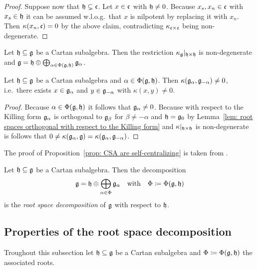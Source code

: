 \begin{proof}
 Suppose now that $\mathfrak{h} \subsetneq \mathfrak{c}$. Let $x \in \mathfrak{c}$ with $\mathfrak{h} \neq 0$. Because $x_s, x_n \in \mathfrak{c}$ with $x_s \in \mathfrak{h}$ it can be assumed w.l.o.g.\ that $x$ is nilpotent by replacing it with $x_n$. Then $\kappa(x_n, \mathfrak{c}) = 0$ by the above claim, contradicting $\kappa_{\mathfrak{c} \times \mathfrak{c}}$ being non-degenerate.
\end{proof}


\begin{corollary}
 Let $\mathfrak{h} \subseteq \mathfrak{g}$ be a Cartan subalgebra. Then the restriction $\kappa_{\mathfrak{g}}|_{\mathfrak{h} \times \mathfrak{h}}$ is non-degenerate and $\mathfrak{g} = \mathfrak{h} \oplus \bigoplus_{\alpha \in \Phi(\mathfrak{g},\mathfrak{h})} \mathfrak{g}_\alpha$.
\end{corollary}


\begin{corollary}\label{cor: g alpha and g -alpha pair non degenerate with the Killing form}
 Let $\mathfrak{h} \subseteq \mathfrak{g}$ be a Cartan subalgebra and $\alpha \in \Phi(\mathfrak{g},\mathfrak{h})$. Then $\kappa(\mathfrak{g}_\alpha, \mathfrak{g}_{-\alpha}) \neq 0$, i.e.\ there exists $x \in \mathfrak{g}_\alpha$ and $y \in \mathfrak{g}_{-\alpha}$ with $\kappa(x,y) \neq 0$.
\end{corollary}
\begin{proof}
 Because $\alpha \in \Phi(\mathfrak{g},\mathfrak{h})$ it follows that $\mathfrak{g}_\alpha \neq 0$. Because with respect to the Killing form $\mathfrak{g}_\alpha$ is orthogonal to $\mathfrak{g}_\beta$ for $\beta \neq -\alpha$ and $\mathfrak{h} = \mathfrak{g}_0$ by Lemma~\ref{lem: root spaces orthogonal with respect to the Killing form} and $\kappa|_{\mathfrak{h} \times \mathfrak{h}}$ is non-degenerate is follows that $0 \neq \kappa(\mathfrak{g}_\alpha, \mathfrak{g}) = \kappa(\mathfrak{g}_\alpha, \mathfrak{g}_{-\alpha})$.
\end{proof}


\begin{remark}
 The proof of Proposition~\ref{prop: CSA are self-centralizing} is taken from \cite[\S 8.2]{Humphreys}.
\end{remark}


\begin{definition}
 Let $\mathfrak{h} \subseteq \mathfrak{g}$ be a Cartan subalgebra. Then the decomposition
 \[
  \mathfrak{g} = \mathfrak{h} \oplus \bigoplus_{\alpha \in \Phi} \mathfrak{g}_\alpha
  \quad\text{with}\quad
  \Phi \coloneqq \Phi(\mathfrak{g},\mathfrak{h})
 \]
 is the \emph{root space decomposition} of $\mathfrak{g}$ with respect to $\mathfrak{h}$.
\end{definition}


\subsection{Properties of the root space decomposition}
Troughout this subsection let $\mathfrak{h} \subseteq \mathfrak{g}$ be a Cartan subalgebra and $\Phi \coloneqq \Phi(\mathfrak{g},\mathfrak{h})$ the associated roots.



